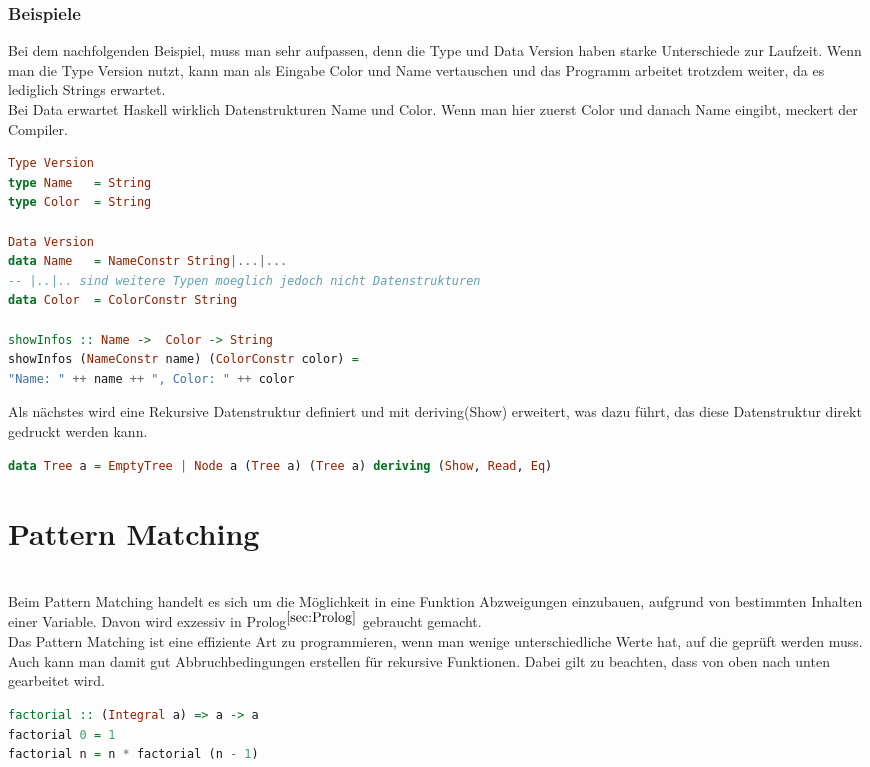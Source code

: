 \subsubsection{Beispiele}
Bei dem nachfolgenden Beispiel, muss man sehr aufpassen, denn die Type und Data Version haben starke Unterschiede zur Laufzeit. Wenn man die Type Version nutzt, kann man als Eingabe Color und Name vertauschen und das Programm arbeitet trotzdem weiter, da es lediglich Strings erwartet. \\
Bei Data erwartet Haskell wirklich Datenstrukturen Name und Color. Wenn man hier zuerst Color und danach Name eingibt, meckert der Compiler. 

\begin{lstlisting}[language=Haskell]  
Type Version
type Name   = String
type Color  = String

Data Version
data Name   = NameConstr String|...|... 
-- |..|.. sind weitere Typen moeglich jedoch nicht Datenstrukturen
data Color  = ColorConstr String

showInfos :: Name ->  Color -> String
showInfos (NameConstr name) (ColorConstr color) =
"Name: " ++ name ++ ", Color: " ++ color
\end{lstlisting}\qquad\newline
Als nächstes wird eine Rekursive Datenstruktur definiert und mit deriving(Show) erweitert, was dazu führt, das diese Datenstruktur direkt gedruckt werden kann. 
\begin{lstlisting}[language=Haskell]  
data Tree a = EmptyTree | Node a (Tree a) (Tree a) deriving (Show, Read, Eq)  
\end{lstlisting}
\section{Pattern Matching}\label{sec:hpm}\qquad\\
Beim Pattern Matching handelt es sich um die Möglichkeit in eine Funktion Abzweigungen einzubauen, aufgrund von bestimmten Inhalten einer Variable. Davon wird exzessiv in Prolog$^{\ref{sec:Prolog}}$ gebraucht gemacht. \\
Das Pattern Matching ist eine effiziente Art zu programmieren, wenn man wenige unterschiedliche Werte hat, auf die geprüft werden muss. Auch kann man damit gut Abbruchbedingungen erstellen für rekursive Funktionen. Dabei gilt zu beachten, dass von oben nach unten gearbeitet wird. 
\begin{lstlisting}[language=Haskell]
factorial :: (Integral a) => a -> a  
factorial 0 = 1  
factorial n = n * factorial (n - 1)  
\end{lstlisting}
